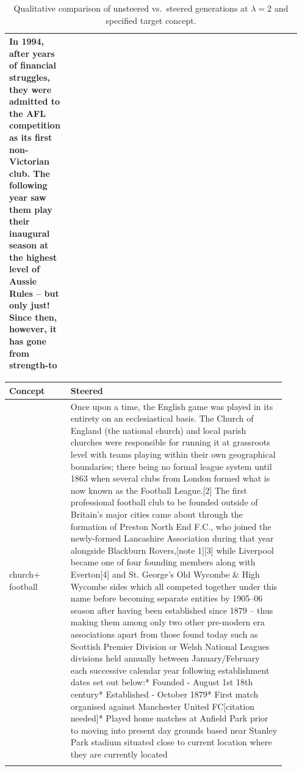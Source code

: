 \documentclass{article}
\theoremstyle{plain}
\theoremstyle{definition}
\theoremstyle{remark}
\begin{document}
\begin{table}[t]
\begin{tabular}{p{0.05\linewidth} p{0.45\linewidth} p{0.45\linewidth}}
In 1994, after years of financial struggles, they were admitted to the AFL competition as its first non-Victorian club.
The following year saw them play their inaugural season at the highest level of Aussie Rules – but only just!
Since then, however, it has gone from strength-to \\
\bottomrule
\end{tabular}
\caption{Qualitative comparison of unsteered vs.\ steered generations at $\lambda = 2$ and specified target concept.}
\label{ap:tab:qualitative-examples-football}
\end{table}

\begin{table}[t]
\centering
\small
\setlength{\tabcolsep}{6pt}
\begin{tabular}{p{0.2\linewidth} p{0.7\linewidth}}
\toprule
\textbf{Concept} & \textbf{Steered} \\
\midrule
church$+$football & Once upon a time, the English game was played in its entirety on an ecclesiastical basis. The Church of England (the national church) and local parish churches were responsible for running it at grassroots level with teams playing within their own geographical boundaries; there being no formal league system until 1863 when several clubs from London formed what is now known as the Football League.[2] The first professional football club to be founded outside of Britain's major cities came about through the formation of Preston North End F.C., who joined the newly-formed Lancashire Association during that year alongside Blackburn Rovers,[note 1][3] while Liverpool became one of four founding members along with Everton[4] and St. George's Old Wycombe \& High Wycombe sides which all competed together under this name before becoming separate entities by 1905–06 season after having been established since 1879 – thus making them among only two other pre-modern era associations apart from those found today such as Scottish Premier Division or Welsh National Leagues divisions held annually between January/February each successive calendar year following establishment dates set out below:* Founded - August 1st 18th century* Established - October 1879* First match organised against Manchester United FC[citation needed]* Played home matches at Anfield Park prior to moving into present day grounds based near Stanley Park stadium situated close to current location where they are currently located \\
\addlinespace


\end{tabular}
\end{table}
\end{document}
